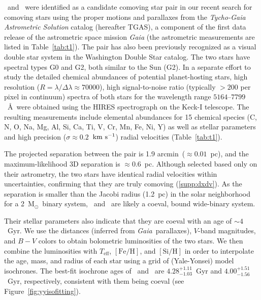 \documentclass[12pt,letterpaper,margin=1in]{article}
\newcommand{\project}[1]{\textsl{#1}}
\newcommand{\acronym}[1]{{\small{#1}}}
\newcommand{\gaia}{\project{Gaia}}
\newcommand{\figname}{Figure}
\newcommand{\tgas}{\acronym{TGAS}}
\newcommand*\elem[1]{\ensuremath{\mathrm{#1}}}
\newcommand*\elemH[1]{\ensuremath{[\mathrm{#1}/\elem{H}]}}
\newcommand{\sunanalog}{\text{Krios}}
\newcommand{\bizarreone}{\text{Kronos}}
\newcommand{\kms}{\ensuremath{\rm km~s^{-1}}}
\newcommand{\msun}{\ensuremath{{\mathrm M}_\odot}}
\renewcommand\tablename{Table}
\begin{document}
\sunanalog\ and \bizarreone\ were identified as a candidate comoving star pair
in our recent search\cite{2017AJ....153..257O} for comoving stars using the
proper motions and parallaxes from the {\it Tycho-Gaia Astrometric Solution}
catalog (hereafter \tgas), a component of the first data release of the
astrometric space mission \gaia\cite{2016A&A...595A...2G} (the astrometric
measurements are listed in \tablename~\ref{tab:t1}).
The pair has also been previously recognized as a visual double star system
in the Washington Double Star catalog\cite{2001AJ....122.3466M}.
The two stars have spectral types G0 and G2, both similar to the Sun (G2).
In a separate effort to study the detailed chemical abundances of potential
planet-hosting stars, high resolution ($R=\lambda/\Delta\lambda\approx 70000$),
high signal-to-noise ratio (typically $>200$ per pixel in continuum) spectra of
both stars for the wavelength range $5164$--$7799$~\AA\ were obtained using the
HIRES spectrograph on the Keck-I telescope\cite{2016ApJS..225...32B}.
The resulting measurements include elemental abundances for 15 chemical species
(C, N, O, Na, Mg, Al, Si, Ca, Ti, V, Cr, Mn, Fe, Ni, Y) as well as stellar
parameters and high precision ($\sigma\approx0.2$~\kms) radial velocities
(Table~\ref{tab:t1}).

The projected separation between the pair is 1.9 arcmin\ ($\approx 0.01$~pc),
and the maximum-likelihood 3D separation is $\approx 0.6$~pc.
Although selected based only on their astrometry, the two stars
have identical radial velocities within uncertainties,
confirming that they are truly comoving (\ref{supp:dxdv}).
As the separation is smaller than the Jacobi radius (1.2~pc) in the solar
neighborhood for a 2~\msun\ binary system\cite{Jiang:2010aa}, \bizarreone\ and
\sunanalog\ are likely a coeval, bound wide-binary system.

Their stellar parameters also indicate that they are coeval with an age of $\sim 4$~Gyr.
We use the distances (inferred from \gaia\ parallaxes), $V$-band magnitudes,
and $B-V$ colors to obtain bolometric luminosities of the two stars\cite{2003AJ....126..778V}.
We then combine the luminosities with $T_\mathrm{eff}$, \elemH{Fe}, and
\elemH{Si} in order to interpolate the age, mass, and radius of each star
using a grid of (Yale-Yonsei) model isochrones\cite{2013ApJ...776...87S}.
The best-fit isochrone ages of \bizarreone\ and \sunanalog\ are
$4.28_{-1.03}^{+1.11}$~Gyr and $4.00_{-1.56}^{+1.51}$~Gyr, respectively,
consistent with them being coeval (see \figname~\ref{fig:yyisofitting}).
\end{document}
